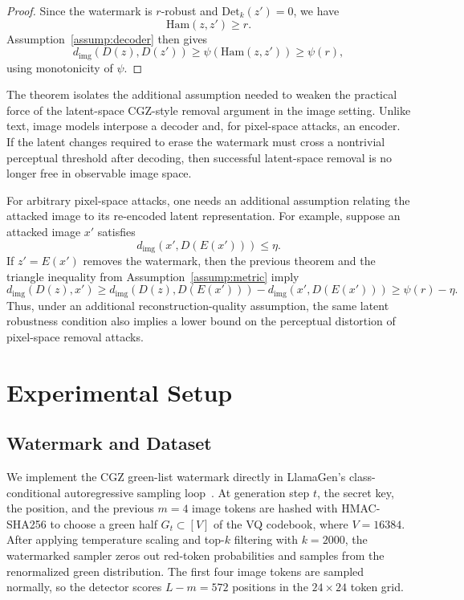 \documentclass[12pt]{article}
\newcommand{\Ham}{\mathrm{Ham}}
\begin{document}
\begin{proof}
Since the watermark is $r$-robust and $\mathrm{Det}_k(z')=0$, we have
\[
\Ham(z,z')\ge r.
\]
Assumption~\ref{assump:decoder} then gives
\[
d_{\mathrm{img}}(D(z),D(z'))\ge \psi(\Ham(z,z'))\ge \psi(r),
\]
using monotonicity of $\psi$.
\end{proof}

The theorem isolates the additional assumption needed to weaken the
practical force of the latent-space CGZ-style removal argument in the
image setting. Unlike text, image models interpose a decoder and, for
pixel-space attacks, an encoder. If the latent changes required to erase
the watermark must cross a nontrivial perceptual threshold after
decoding, then successful latent-space removal is no longer free in
observable image space.

For arbitrary pixel-space attacks, one needs an additional assumption
relating the attacked image to its re-encoded latent representation. For
example, suppose an attacked image $x'$ satisfies
\[
d_{\mathrm{img}}(x',D(E(x'))) \le \eta.
\]
If $z'=E(x')$ removes the watermark, then the previous theorem and the
triangle inequality from Assumption~\ref{assump:metric} imply
\[
d_{\mathrm{img}}(D(z),x')
\ge
d_{\mathrm{img}}(D(z),D(E(x'))) - d_{\mathrm{img}}(x',D(E(x')))
\ge
\psi(r)-\eta.
\]
Thus, under an additional reconstruction-quality assumption, the same
latent robustness condition also implies a lower bound on the perceptual
distortion of pixel-space removal attacks.

\section{Experimental Setup}
\subsection{Watermark and Dataset}

We implement the CGZ green-list watermark directly in LlamaGen's
class-conditional autoregressive sampling loop~\cite{llamagen2024}. At
generation step $t$, the secret key, the position, and the previous
$m=4$ image tokens are hashed with HMAC-SHA256 to choose a green half
$G_t\subset [V]$ of the VQ codebook, where $V=16384$. After applying
temperature scaling and top-$k$ filtering with $k=2000$, the
watermarked sampler zeros out red-token probabilities and samples from
the renormalized green distribution. The first four image tokens are
sampled normally, so the detector scores $L-m=572$ positions in the
$24\times24$ token grid.
\end{document}
